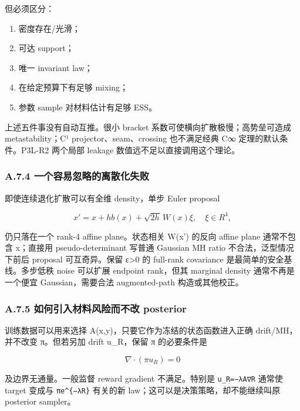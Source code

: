 \documentclass[
  11pt,
  a4paper,
]{article}
\providecommand{\tightlist}{%
  \setlength{\itemsep}{0pt}\setlength{\parskip}{0pt}}
\begin{document}
但必须区分：

\begin{enumerate}
\def\labelenumi{\arabic{enumi}.}
\tightlist
\item
  密度存在/光滑；
\item
  可达 support；
\item
  唯一 invariant law；
\item
  在给定预算下有足够 mixing；
\item
  参数 sample 对材料估计有足够 ESS。
\end{enumerate}

上述五件事没有自动互推。很小 bracket 系数可使横向扩散极慢；高势垒可造成
metastability；C¹ projector、seam、crossing 也不满足经典 C∞
定理的默认条件。P3L-R2 两个局部 leakage 数值远不足以直接调用这个理论。

\hypertarget{a.7.4-ux4e00ux4e2aux5bb9ux6613ux5ffdux7565ux7684ux79bbux6563ux5316ux5931ux8d25}{%
\subsubsection{A.7.4
一个容易忽略的离散化失败}\label{a.7.4-ux4e00ux4e2aux5bb9ux6613ux5ffdux7565ux7684ux79bbux6563ux5316ux5931ux8d25}}

即使连续退化扩散可以有全维 density，单步 Euler proposal

\[
x'=x+h b(x)+\sqrt{2h}\,W(x)\xi,\quad\xi\in R^4,
\]

仍只落在一个 rank-4 affine plane。状态相关 W(x') 的反向 affine plane
通常不包含 x；直接用 pseudo-determinant 写普通 Gaussian MH ratio
不合法，泛型情况下前后 proposal 可互奇异。保留 ε\textgreater0 的
full-rank covariance 是最简单的安全基线。多步低秩 noise 可以扩展
endpoint rank，但其 marginal density 通常不再是一个便宜
Gaussian，需要合法 augmented-path 构造或其他校正。

\hypertarget{a.7.5-ux5982ux4f55ux5f15ux5165ux6750ux6599ux98ceux9669ux800cux4e0dux6539-posterior}{%
\subsubsection{A.7.5 如何引入材料风险而不改
posterior}\label{a.7.5-ux5982ux4f55ux5f15ux5165ux6750ux6599ux98ceux9669ux800cux4e0dux6539-posterior}}

训练数据可以用来选择 A(x,y)，只要它作为冻结的状态函数进入正确
drift/MH，并不改变 π。但若另加 drift u\_\allowbreak{}R，保留 π 的必要条件是

\[
\nabla\cdot(\pi u_R)=0
\]

及边界无通量。一般监督 reward gradient 不满足。特别是
\texttt{u\_\allowbreak{}R=−λA∇R} 通常使 target 变成与 \texttt{πe\^{}\{−λR\}} 有关的新
law；这可以是决策策略，却不能继续叫原 posterior sampler。
\end{document}
